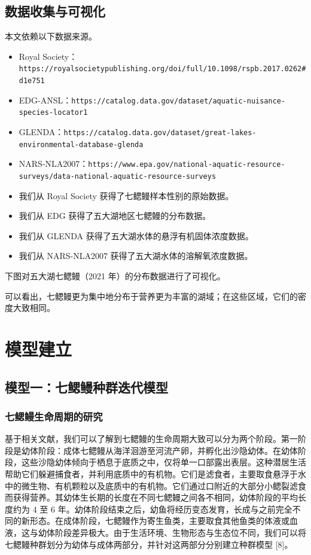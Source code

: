 \documentclass[11pt,a4paper]{ctexart}
\begin{document}
\subsection{数据收集与可视化}

本文依赖以下数据来源。

\begin{itemize}
\item Royal Society：\texttt{https://royalsocietypublishing.org/doi/full/10.1098/rspb.2017.0262\#d1e751}
\item EDG-ANSL：\texttt{https://catalog.data.gov/dataset/aquatic-nuisance-species-locator1}
\item GLENDA：\texttt{https://catalog.data.gov/dataset/great-lakes-environmental-database-glenda}
\item NARS-NLA2007：\texttt{https://www.epa.gov/national-aquatic-resource-surveys/data-national-aquatic-resource-surveys}
\end{itemize}

\begin{itemize}
\item 我们从 Royal Society 获得了七鳃鳗样本性别的原始数据。
\item 我们从 EDG 获得了五大湖地区七鳃鳗的分布数据。
\item 我们从 GLENDA 获得了五大湖水体的悬浮有机固体浓度数据。
\item 我们从 NARS-NLA2007 获得了五大湖水体的溶解氧浓度数据。
\end{itemize}

下图对五大湖七鳃鳗（2021 年）的分布数据进行了可视化。

可以看出，七鳃鳗更为集中地分布于营养更为丰富的湖域；在这些区域，它们的密度大致相同。
\section{模型建立}

\subsection{模型一：七鳃鳗种群迭代模型}

\subsubsection{七鳃鳗生命周期的研究}

基于相关文献，我们可以了解到七鳃鳗的生命周期大致可以分为两个阶段。第一阶段是幼体阶段：成体七鳃鳗从海洋洄游至河流产卵，并孵化出沙隐幼体。在幼体阶段，这些沙隐幼体倾向于栖息于底质之中，仅将单一口部露出表层。这种潜居生活帮助它们躲避捕食者，并利用底质中的有机物。它们是滤食者，主要取食悬浮于水中的微生物、有机颗粒以及底质中的有机物。它们通过口附近的大部分小鳃裂滤食而获得营养。其幼体生长期的长度在不同七鳃鳗之间各不相同，幼体阶段的平均长度约为 4 至 6 年。幼体阶段结束之后，幼鱼将经历变态发育，长成与之前完全不同的新形态。在成体阶段，七鳃鳗作为寄生鱼类，主要取食其他鱼类的体液或血液，这与幼体阶段差异极大。由于生活环境、生物形态与生态位不同，我们可以将七鳃鳗种群划分为幼体与成体两部分，并针对这两部分分别建立种群模型 [8]。
\end{document}

